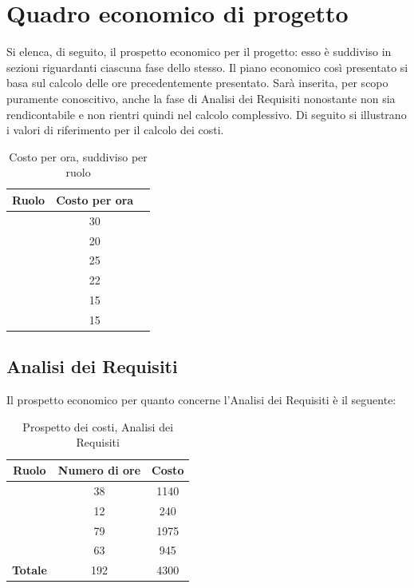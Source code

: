 \newpage

\section{Quadro economico di progetto}
Si elenca, di seguito, il prospetto economico per il progetto: esso è suddiviso in sezioni riguardanti ciascuna fase dello stesso. Il piano economico così presentato si basa sul calcolo delle ore precedentemente presentato. Sarà inserita, per scopo puramente conoscitivo, anche la fase di Analisi dei Requisiti nonostante non sia rendicontabile e non rientri quindi nel calcolo complessivo. Di seguito si illustrano i valori di riferimento per il calcolo dei costi.

\begin{table}[H]
	\begin{center}
		\begin{tabular}{|c|c|c|}
			\hline
			\textbf{Ruolo}	& \textbf{Costo per ora} \\
			\hline
			\Res	&	30	\\
			\hline
			\Amm	&	20	\\
			\hline
			\Ana	&	25	\\
			\hline
			\Prog	&	22	\\
			\hline
			\Progr	&	15	\\
			\hline
			\Ver	&	15	\\
			\hline
		\end{tabular}
	\end{center}
	\caption{Costo per ora, suddiviso per ruolo}
\end{table}

\subsection{Analisi dei Requisiti}
Il prospetto economico per quanto concerne l'Analisi dei Requisiti è il seguente:


\begin{table}[H]
	\begin{center}
		\begin{tabular}{|c|c|c|}
			\hline
			\textbf{Ruolo}	& \textbf{Numero di ore} & \textbf{Costo} \\
			\hline
			\Res	&	38  &	1140	\\
			\hline
			\Amm	&	12  &	240	\\
			\hline
			\Ana	&	79  &	1975	\\
			\hline
			\Ver	&	63  &	945	\\
			\hline
			\textbf{Totale}  &	192	&	4300	\\
			\hline
		\end{tabular}
	\end{center}
	\caption{Prospetto dei costi, Analisi dei Requisiti }
\end{table}

